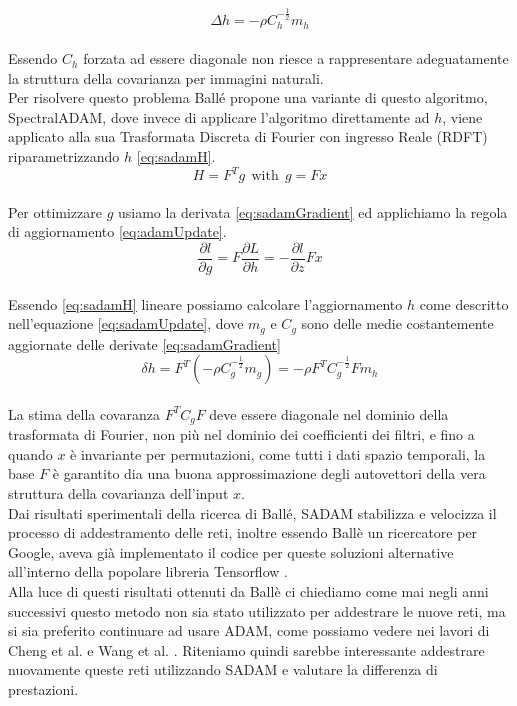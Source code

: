 \begin{equation}\label{eq:adamUpdate}
\Delta h = - \rho C_{h}^{-\tfrac{1}{2}} m_{h}
\end{equation}\\
Essendo $C_{h}$ forzata ad essere diagonale non riesce a rappresentare adeguatamente la struttura della covarianza per immagini naturali.\\
Per risolvere questo problema Ballé propone una variante di questo algoritmo, SpectralADAM, dove invece di applicare l’algoritmo direttamente ad $h$, viene applicato alla sua Trasformata Discreta di Fourier con ingresso Reale (RDFT) riparametrizzando $h$ \ref{eq:sadamH}.\\
\begin{equation}\label{eq:sadamH}
H = F^{T} g \:\: \textrm{with} \:\: g = Fx
\end{equation}\\
Per ottimizzare $g$ usiamo la derivata \ref{eq:sadamGradient} ed applichiamo la regola di aggiornamento \ref{eq:adamUpdate}.\\
\begin{equation}\label{eq:sadamGradient}
\dfrac{\partial l}{\partial g} = F \dfrac{\partial L}{\partial h} = - \dfrac{\partial l}{\partial z} Fx
\end{equation}\\
Essendo \ref{eq:sadamH} lineare possiamo calcolare l’aggiornamento $h$ come descritto nell’equazione \ref{eq:sadamUpdate}, dove $m_{g}$ e $C_{g}$ sono delle medie costantemente aggiornate delle derivate \ref{eq:sadamGradient} \\
\begin{equation}\label{eq:sadamUpdate}
\delta h = F^{T} (-\rho C_{g}^{-\tfrac{1}{2}} m_{g}) = - \rho F^{T} C_{g}^{-\tfrac{1}{2}} Fm_{h}
\end{equation}\\
La stima della covaranza $ F^{T} C_{g} F$ deve essere diagonale nel dominio della trasformata di Fourier, non più nel dominio dei coefficienti dei filtri, e fino a quando $x$ è invariante per permutazioni, come tutti i dati spazio temporali, la base $F$ è garantito dia una buona approssimazione degli autovettori della vera struttura della covarianza dell’input $x$.\\
Dai risultati sperimentali della ricerca di Ballé, SADAM stabilizza e velocizza il processo di addestramento delle reti, inoltre essendo Ballè un ricercatore per Google, aveva già implementato il codice per queste soluzioni alternative all’interno della popolare libreria Tensorflow \cite{tensorflow2015-whitepaper}.\\
Alla luce di questi risultati ottenuti da Ballè ci chiediamo come mai negli anni successivi questo metodo non sia stato utilizzato per addestrare le nuove reti, ma si sia preferito continuare ad usare ADAM, come possiamo vedere nei lavori di Cheng et al. \cite{cheng2020learned} e Wang et al. \cite{wang2022neural}. Riteniamo quindi sarebbe interessante addestrare nuovamente queste reti utilizzando SADAM e valutare la differenza di prestazioni.


